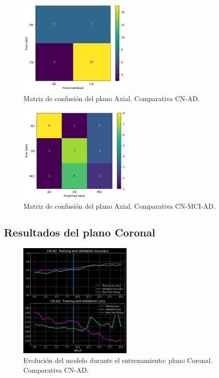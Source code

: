 \begin{figure}[H]
    \centering
    \includegraphics[width=0.5\textwidth]{./imgs/resultados/axial/CN_AD_cm_AXIAL}
    \caption{Matriz de confusión del plano Axial. Comparativa CN-AD. }
    \label{fig:mc-axial-cn-ad}
\end{figure}

\begin{figure}[H]
    \centering
    \includegraphics[width=0.5\textwidth]{./imgs/resultados/axial/CN_MCI_AD_cm_AXIAL}
    \caption{Matriz de confusión del plano Axial. Comparativa CN-MCI-AD. }
    \label{fig:mc-axial-cn-mci-ad}
\end{figure}


\subsection{Resultados del plano Coronal}\label{subsec:resultados-del-plano-coronal}

\begin{figure}[H]
    \centering
    \includegraphics[width=0.5\textwidth]{./imgs/resultados/coronal/CN_AD_output_CORONAL}
    \caption{Evolución del modelo durante el entrenamiento: plano Coronal. Comparativa CN-AD. }
    \label{fig:coronal-cn-ad}
\end{figure}

